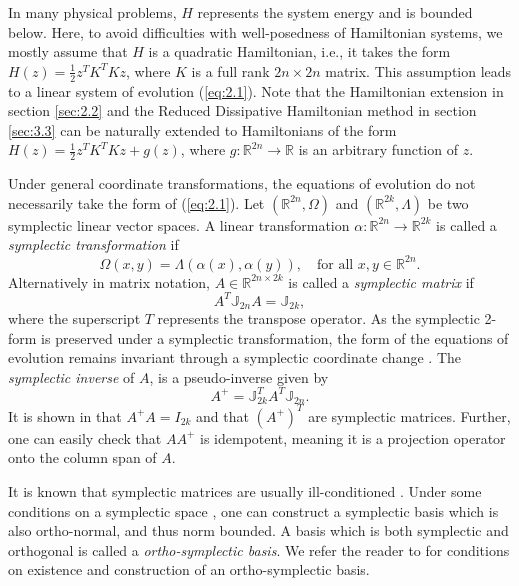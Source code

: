 In many physical problems, $H$ represents the system energy and is bounded below. Here, to avoid difficulties with well-posedness of Hamiltonian systems,  we mostly assume that $H$ is a quadratic Hamiltonian, i.e., it takes the form $H(z) = \frac 1 2 z^T K^T K z$, where $K$ is a full rank $2n\times 2n$ matrix. This assumption leads to a linear system of evolution (\ref{eq:2.1}). Note that the Hamiltonian extension in section \ref{sec:2.2} and the Reduced Dissipative Hamiltonian method in section \ref{sec:3.3} can be naturally extended to Hamiltonians of the form $H(z) = \frac 1 2 z^T K^T K z + g(z)$, where $g:\mathbb R^{2n} \to \mathbb R$ is an arbitrary function of $z$. 

Under general coordinate transformations, the equations of evolution do not necessarily take the form of (\ref{eq:2.1}). Let $(\mathbb R^{2n},\Omega)$ and $(\mathbb R^{2k},\Lambda)$ be two symplectic linear vector spaces. A linear transformation $\alpha :\mathbb R^{2n} \to \mathbb R^{2k}$ is called a \emph{symplectic transformation} \cite{Marsden:2010:IMS:1965128} if
\begin{equation}
	\Omega(x,y) = \Lambda(\alpha(x),\alpha(y)), \quad \text{for all } x,y\in \mathbb R^{2n}.
\end{equation}
Alternatively in matrix notation, $A\in \mathbb R^{2n\times 2k}$ is called a \emph{symplectic matrix} if
\begin{equation}
	A^T \mathbb{J}_{2n} A = \mathbb{J}_{2k},
\end{equation}
where the superscript $T$ represents the transpose operator. As the symplectic 2-form is preserved under a symplectic transformation, the form of the equations of evolution remains invariant through a symplectic coordinate change  \cite{Marsden:2010:IMS:1965128}. The \emph{symplectic inverse} of $A$, is a pseudo-inverse given by
\begin{equation}
	A^+ = \mathbb{\mathbb J}_{2k}^T A^T \mathbb J_{2n}.
\end{equation}
It is shown in \cite{Peng:2014di} that $A^+A = I_{2k}$ and that $(A^+)^T$ are symplectic matrices. Further, one can easily check that $AA^+$ is idempotent, meaning it is a projection operator onto the column span of $A$. 

It is known that symplectic matrices are usually ill-conditioned \cite{Karow:2006cf}. Under some conditions on a symplectic space \cite{da2003introduction}, one can construct a symplectic basis which is also ortho-normal, and thus norm bounded. A basis which is both symplectic and orthogonal is called a \emph{ortho-symplectic basis}. We refer the reader to \cite{da2003introduction} for conditions on existence and construction of an ortho-symplectic basis.

